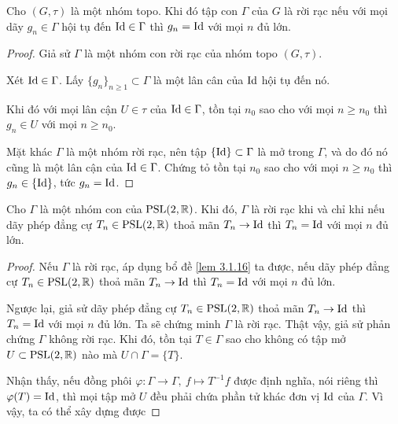 \begin{lem}\label{lem 3.1.16}
    Cho $(G,\tau)$ là một nhóm topo. Khi đó tập con $\Gamma$ của $G$ là rời rạc nếu với mọi dãy $g_n \in \Gamma$ hội tụ đến $\operatorname{Id} \in \Gamma$ thì $g_n = \operatorname{Id}$ với mọi $n$ đủ lớn.
\end{lem}
\begin{proof}
    Giả sử $\Gamma$ là một nhóm con rời rạc của nhóm topo $(G,\tau)$.
    
    Xét $\operatorname{Id}\in \Gamma$. Lấy $\{g_n\}_{n\geq 1}\subset \Gamma$ là một lân cân của $\operatorname{Id}$ hội tụ đến nó.
    
    Khi đó với mọi lân cận $U \in \tau$ của $\operatorname{Id} \in \Gamma$, tồn tại $n_0$ sao cho với mọi $n \geq n_0$ thì $g_n \in U$ với mọi $n \geq n_0$. 
    
    Mặt khác $\Gamma$ là một nhóm rời rạc, nên tập $\{\operatorname{Id}\}\subset \Gamma$ là mở trong $\Gamma$, và do đó nó cũng là một lân cận  của $\operatorname{Id} \in \Gamma$. 
    Chứng tỏ tồn tại $n_0$ sao cho với mọi $n\geq n_0$ thì $g_n \in \{\operatorname{Id}\}$, tức $g_n = \operatorname{Id}$. 
\end{proof}
\begin{prop}\label{prop 3.1.17}
    Cho $\Gamma$ là một nhóm con của $\operatorname{PSL}(2,\mathbb{R})$. Khi đó, $\Gamma$ là rời rạc khi và chỉ khi nếu dãy phép đẳng cự $T_n \in \operatorname{PSL}(2,\mathbb{R})$ thoả mãn $T_n \to \operatorname{Id}$ thì $T_n = \operatorname{Id}$ với mọi $n$ đủ lớn.
\end{prop}
\begin{proof}
    Nếu $\Gamma$ là rời rạc, áp dụng bổ đề \ref{lem 3.1.16} ta được, nếu dãy phép đẳng cự $T_n \in \operatorname{PSL}(2,\mathbb{R})$ thoả mãn $T_n \to \operatorname{Id}$ thì $T_n = \operatorname{Id}$ với mọi $n$ đủ lớn.

    Ngược lại, giả sử dãy phép đẳng cự $T_n \in \operatorname{PSL}(2,\mathbb{R})$ thoả mãn $T_n \to \operatorname{Id}$ thì $T_n = \operatorname{Id}$ với mọi $n$ đủ lớn. Ta sẽ chứng minh $\Gamma$ là rời rạc. Thật vậy, giả sử phản chứng $\Gamma$ không rời rạc. Khi đó, tồn tại $T \in \Gamma$ sao cho không có tập mở $U \subset \operatorname{PSL}(2,\mathbb{R})$ nào mà $U \cap \Gamma = \{T\}$. 

    
    Nhận thấy, nếu đồng phôi $\varphi: \Gamma \to \Gamma,~f\mapsto  T^{-1}f$ được định nghĩa, nói riêng thì $\varphi(T) = \operatorname{Id}$, thì mọi tập mở $U$ đều phải chứa phần tử khác đơn vị $\operatorname{Id}$ của $\Gamma$. Vì vậy, ta có thể xây dựng được 
\end{proof}

